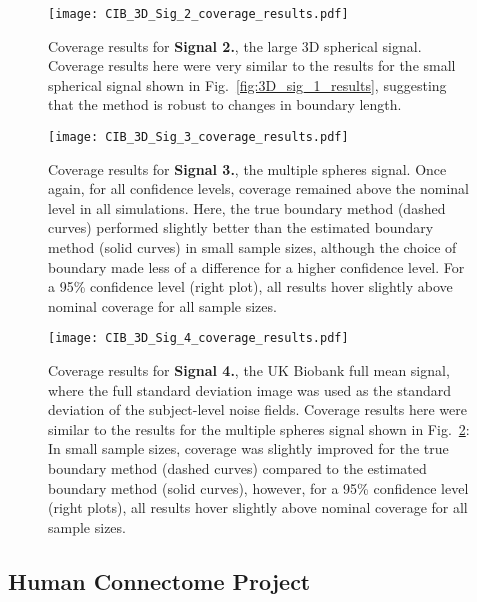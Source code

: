 \begin{figure}[htbp]
\hspace*{-1.5cm}
    \texttt{[image: CIB\_3D\_Sig\_2\_coverage\_results.pdf]}
\caption{Coverage results for \textbf{Signal 2.}, the large 3D spherical signal. Coverage results here were very similar to the results for the small spherical signal shown in Fig.\ \ref{fig:3D_sig_1_results}, suggesting that the method is robust to changes in boundary length.}
\label{fig:3D_sig_2_results}
\end{figure}

\begin{figure}[htbp]
\hspace*{-1.5cm}
    \texttt{[image: CIB\_3D\_Sig\_3\_coverage\_results.pdf]}
\caption{Coverage results for \textbf{Signal 3.}, the multiple spheres signal. Once again, for all confidence levels, coverage remained above the nominal level in all simulations. Here, the true boundary method (dashed curves) performed slightly better than the estimated boundary method (solid curves) in small sample sizes, although the choice of boundary made less of a difference for a higher confidence level. For a 95\% confidence level (right plot), all results hover slightly above nominal coverage for all sample sizes.}
\label{fig:3D_sig_3_results}
\end{figure}

\begin{figure}[htbp]
\hspace*{-1.5cm}
    \texttt{[image: CIB\_3D\_Sig\_4\_coverage\_results.pdf]}
\caption{ Coverage results for \textbf{Signal 4.}, the UK Biobank full mean signal, where the full standard deviation image was used as the standard deviation of the subject-level noise fields. Coverage results here were similar to the results for the multiple spheres signal shown in Fig.\ \ref{fig:3D_sig_3_results}: In small sample sizes, coverage was slightly improved for the true boundary method (dashed curves) compared to the estimated boundary method (solid curves), however, for a 95\% confidence level (right plots), all results hover slightly above nominal coverage for all sample sizes.}
\label{fig:3D_sig_4_results}
\end{figure}

\clearpage

\subsection{Human Connectome Project}
\label{HCP_results}

